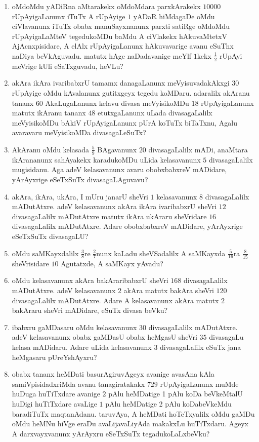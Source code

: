 \begin{enumerate}
\item oMdoMdu yADiRna aMtarakekx oMdoMdara parxkArakekx $10000$
rUpAyigaLanunx iTuTx A rUpAyige $1$ yADaR hiMdagaDe oMdu ciVlavanunx
iTuTx obabx manuSayxnanunx parxti satiRge oMdoMdu rUpAyigaLaMteV
tegedukoMDu baMdu A ciVlakekx hAkuvaMtetxV AjAcnxpisidare, A elAlx
rUpAyigaLanunx hAkuvavarige avanu eSuThx naDiya beVkAguvadu. matutx
hAge naDadavanige meYlf $1$kekx $\frac{1}{2}$ rUpAyi meVrige kUli
eSaTxguvadu, heVLu?

\item akAra ikAra ivaribabxrU tamamx danagaLanunx meVyisuvadakAkxgi
$30$ rUpAyige oMdu kAvalanunx gutitxgeyx tegedu koMDaru. adaralilx
akAranu tananx $60$ AkaLugaLanunx kelavu divasa meVyisikoMDu $18$
rUpAyigaLanunx matutx ikAranu tananx $48$ etutxgaLanunx uLada
divasagaLalilx meVyisikoMDu bAkiV rUpAyigaLanunx pUrA koTuTx biTaTxnu,
Agalu avaravaru meVyisikoMDa divasagaLeSuTx?

\item AkAranu oMdu kelasada $\frac{5}{9}$ BAgavanunx $20$
divasagaLalilx mADi, anaMtara ikArananunx sahAyakekx karadukoMDu uLida
kelasavanunx $5$ divasagaLalilx mugisidanu. Aga adeV kelasavanunx
avaru obobxbabxreV mADidare, yArAyxrige eSeTxSuTx divasagaLAguvavu?

\item akAra, ikAra, ukAra, I mUru janarU sheVri $1$ kelasavanunx $8$
divasagaLalilx mADutAtxre. adeV kelasavanunx akAra ikAra ivaribabxrU
sheVri $12$ divasagaLalilx mADutAtxre matutx ikAra ukAraru sheVridare
$16$ divasagaLalilx mADutAtxre. Adare obobxbabxreV mADidare,
yArAyxrige eSeTxSuTx divasagaLU?

\item oMdu saMKayxdalilx $\frac{3}{8}$re $\frac{2}{7}$nunx kaLadu
sheVSadalilx A saMKayxda $\frac{5}{16}$ra $\frac{8}{15}$ sheVrisidare
$10$ Agutatxde, A saMKayx yAvadu?

\item oMdu kelasavanunx akAra bakAraribabxrU sheVri $168$
divasagaLalilx mADutAtxre. adeV kelasavanunx $2$ akAra matutx bakAra
sheVri $120$ divasagaLalilx mADutAtxre. Adare A kelasavanunx akAra
matutx $2$ bakAraru sheVri mADidare, eSuTx divasa beVku?

\item ibabxru gaMDasaru oMdu kelasavanunx $30$ divasagaLalilx
mADutAtxre. adeV kelasavanunx obabx gaMDasU obabx heMgasU sheVri $35$
divasagaLu kelasa mADidaru. Adare uLida kelasavanunx 3 divasagaLalilx
eSuTx jana heMgasaru pUreYshAyxru?

\item obabx tananx heMDati basurAgiruvAgeyx avanige avasAna kAla
samiVpisidadxriMda avanu tanagiratakakx $729$ rUpAyigaLanunx muMde
huDuga huTiTxdare avanige $2$ pAlu heMDatige 1 pAlu koDa beVkeMtalU
huDigi huTiTxdare avaLige $1$ pAlu heMDatige 2 pAlu koDabeVkeMdu
baradiTuTx maqtanAdanu. taruvAya, A heMDati hoTeTxyalilx oMdu gaMDu
oMdu heMNu hiVge eraDu avaLijavaLiyAda makakxLu huTiTxdaru. Ageyx A
darxvayxvanunx yArAyxru eSeTxSuTx tegadukoLaLxbeVku?


\end{enumerate}

